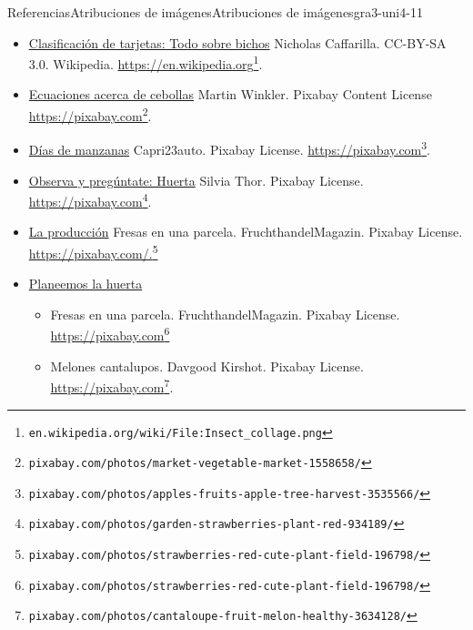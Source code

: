 \documentclass[oneside,10pt,]{article}
\begin{document}
\begin{references-section}{Referencias}{Atribuciones de imágenes}{}{Atribuciones de imágenes}{}{}{gra3-uni4-11}
\begin{itemize}[label=\textbullet]
\begin{itemize}[label=$\circ$]
\end{itemize}
\item{}\hyperref[act-clasificacionDeTarjetas-todoSobreBichos]{Clasificación de tarjetas: Todo sobre bichos} Nicholas Caffarilla. CC-BY-SA 3.0. Wikipedia. \href{https://en.wikipedia.org/wiki/File:Insect_collage.png}{https:\slash{}\slash{}en.wikipedia.org}\footnote{\nolinkurl{en.wikipedia.org/wiki/File:Insect_collage.png}\label{gra3-uni4-11-2-4-3}}.%
\item{}\hyperref[act-ecuacionesCebollas]{Ecuaciones acerca de cebollas} Martin Winkler. Pixabay Content License \href{https://pixabay.com/photos/market-vegetable-market-1558658/}{https:\slash{}\slash{}pixabay.com}\footnote{\nolinkurl{pixabay.com/photos/market-vegetable-market-1558658/}\label{gra3-uni4-11-2-5-3}}.%
\item{}\hyperref[act-diasDeManzanas]{Días de manzanas} Capri23auto. Pixabay License. \href{https://pixabay.com/photos/apples-fruits-apple-tree-harvest-3535566/}{https:\slash{}\slash{}pixabay.com}\footnote{\nolinkurl{pixabay.com/photos/apples-fruits-apple-tree-harvest-3535566/}\label{gra3-uni4-11-2-6-3}}.%
\item{}\hyperref[warm-observa-huerta]{Observa y pregúntate: Huerta} Silvia Thor. Pixabay License. \href{https://pixabay.com/photos/garden-strawberries-plant-red-934189/}{https:\slash{}\slash{}pixabay.com}\footnote{\nolinkurl{pixabay.com/photos/garden-strawberries-plant-red-934189/}\label{gra3-uni4-11-2-7-3}}.%
\item{}\hyperref[act-produccionFresas]{La producción} Fresas en una parcela. Fruchthandel\textunderscore{}Magazin. Pixabay License. \href{https://pixabay.com/photos/strawberries-red-cute-plant-field-196798/}{https:\slash{}\slash{}pixabay.com\slash{}.}\footnote{\nolinkurl{pixabay.com/photos/strawberries-red-cute-plant-field-196798/}\label{gra3-uni4-11-2-8-3}}%
\item{}\hyperref[act-planeemosLaHuerta]{Planeemos la huerta}%
%
\begin{itemize}[label=$\circ$]
\item{}Fresas en una parcela. Fruchthandel\textunderscore{}Magazin. Pixabay License. \href{https://pixabay.com/photos/strawberries-red-cute-plant-field-196798/}{https:\slash{}\slash{}pixabay.com}\footnote{\nolinkurl{pixabay.com/photos/strawberries-red-cute-plant-field-196798/}\label{gra3-uni4-11-2-9-2-1-1-2}}%
\item{}Melones cantalupos. Davgood Kirshot. Pixabay License. \href{https://pixabay.com/photos/cantaloupe-fruit-melon-healthy-3634128/}{https:\slash{}\slash{}pixabay.com}\footnote{\nolinkurl{pixabay.com/photos/cantaloupe-fruit-melon-healthy-3634128/}\label{gra3-uni4-11-2-9-2-2-1-2}}.%

\end{itemize}
\end{itemize}
\end{references-section}
\end{document}
